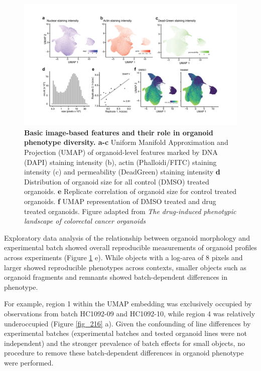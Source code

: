 \begin{flushleft}
\begin{figure}[h]
\centering
\includegraphics[width=\textwidth,
                height=\textheight,
                keepaspectratio]{figures/promise/pdf/fig_1_5.pdf}
\caption[Basic image-based features and their role in organoid phenotype diversity]{\textbf{Basic image-based features and their role in organoid phenotype diversity. a-c} Uniform Manifold Approximation and Projection (UMAP) of organoid-level features marked by DNA (DAPI) staining intensity (b), actin (Phalloidi/FITC) staining intensity (c) and permeability (DeadGreen) staining intensity \textbf{d} Distribution of organoid size for all control (DMSO) treated organoids. \textbf{e} Replicate correlation of organoid size for control treated organoids. \textbf{f} UMAP representation of DMSO treated and drug treated organoids. Figure adapted from \textit{The drug-induced phenotypic landscape of colorectal cancer organoids} \citep{betgeDruginducedPhenotypicLandscape2022}}
\label{fig_145}
\end{figure}
\bigbreak

Exploratory data analysis of the relationship between organoid morphology and experimental batch showed overall reproducible measurements of organoid profiles across experiments (Figure \ref{fig_145} e). While objects with a log-area of 8 pixels and larger showed reproducible phenotypes across contexts, smaller objects such as organoid fragments and remnants showed batch-dependent differences in phenotype.

\bigbreak
For example, region 1 within the UMAP embedding was exclusively occupied by observations from batch HC1092-09 and HC1092-10, while region 4 was relatively underoccupied (Figure \ref{fig_216} a). Given the confounding of line differences by experimental batches (experimental batches and tested organoid lines were not independent) and the stronger prevalence of batch effects for small objects, no procedure to remove these batch-dependent differences in organoid phenotype were performed. 


\end{flushleft}
